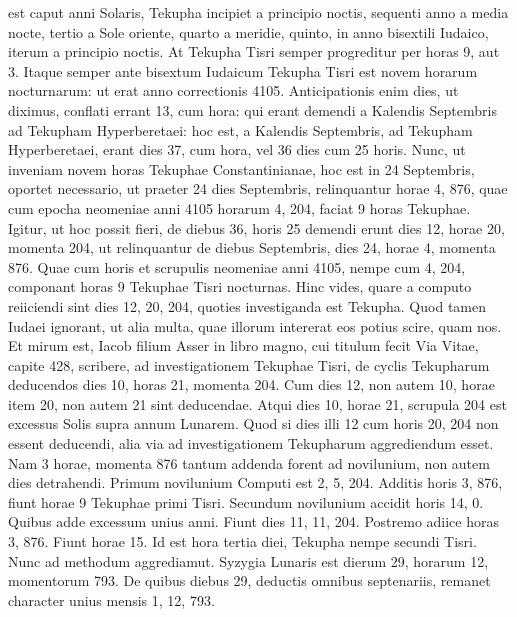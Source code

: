 est caput anni Solaris, Tekupha incipiet a principio noctis, sequenti anno
a media nocte, tertio a Sole oriente, quarto a meridie, quinto, in anno
bisextili Iudaico, iterum a principio noctis.
At Tekupha Tisri
semper progreditur per horas 9, aut 3.
Itaque semper ante bisextum
Iudaicum Tekupha Tisri est novem horarum nocturnarum: ut
erat anno correctionis 4105.
Anticipationis enim dies, ut diximus,
conflati errant 13, cum hora: qui erant demendi a Kalendis
Septembris ad Tekupham Hyperberetaei: hoc est, a Kalendis
Septembris, ad Tekupham Hyperberetaei, erant dies 37, cum
hora, vel 36 dies cum 25 horis.
%
Nunc, ut inveniam novem horas
Tekuphae Constantinianae, hoc est in 24 Septembris, oportet
necessario, ut praeter 24 dies Septembris, relinquantur horae 4,
876, quae cum epocha neomeniae anni 4105 horarum 4, 204, faciat
9 horas Tekuphae.
Igitur, ut hoc possit fieri, de diebus 36, horis 25
demendi erunt dies 12, horae 20, momenta 204, ut relinquantur
de diebus Septembris, dies 24, horae 4, momenta 876.
Quae cum
horis et scrupulis neomeniae anni 4105, nempe cum 4, 204, componant
horas 9 Tekuphae Tisri nocturnas.
Hinc vides, quare a computo
reiiciendi sint dies 12, 20, 204, quoties investiganda est Tekupha.
Quod tamen Iudaei ignorant, ut alia multa, quae illorum
intererat eos potius scire, quam nos.
Et mirum est, Iacob filium Asser
in libro magno, cui titulum fecit Via Vitae, capite 428, scribere, ad
investigationem Tekuphae Tisri, de cyclis Tekupharum deducendos
dies 10, horas 21, momenta 204.
Cum dies 12, non autem 10, horae
item 20, non autem 21 sint deducendae.
Atqui dies 10, horae 21, scrupula
204 est excessus Solis supra annum Lunarem.
Quod si dies illi 12
cum horis 20, 204 non essent deducendi, alia via ad investigationem
Tekupharum aggrediendum %
 esset.
Nam 3 horae, momenta 876 tantum
addenda forent ad novilunium, non autem dies detrahendi.
Primum
novilunium Computi est 2, 5, 204.
Additis horis 3, 876, fiunt horae 9
Tekuphae primi Tisri.
Secundum novilunium accidit horis 14, 0.
Quibus adde excessum unius anni.
Fiunt dies 11, 11, 204.
Postremo
adiice horas 3, 876.
Fiunt horae 15.
Id est hora tertia diei, Tekupha
nempe secundi Tisri.
Nunc ad methodum aggrediamut.
Syzygia
Lunaris est dierum 29, horarum 12, momentorum 793.
De quibus
diebus 29, deductis omnibus septenariis, remanet character unius
mensis 1, 12, 793.
